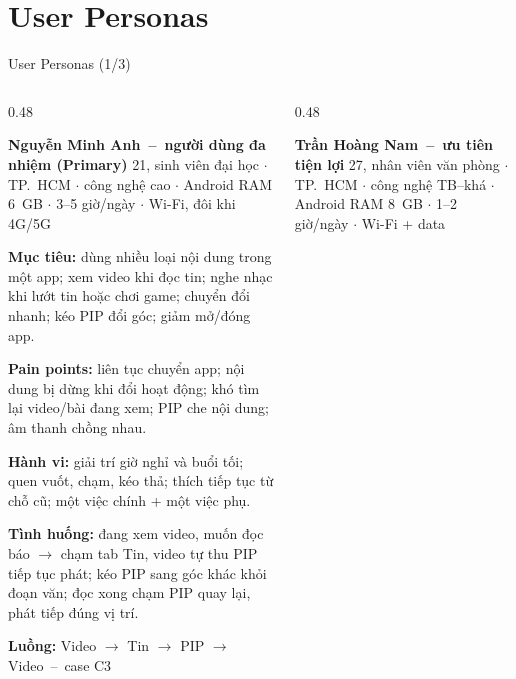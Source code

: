 \documentclass[aspectratio=169]{beamer}
\begin{document}
\section{User Personas}
\begin{frame}{User Personas (1/3)}
  \begin{columns}
    \begin{column}{0.48\textwidth}
      \begin{block}{\scriptsize\bfseries Nguyễn Minh Anh~--~người dùng đa nhiệm {\tiny(Primary)}}
        {\tiny\color{brandgray} 21, sinh viên đại học $\cdot$ TP.\ HCM $\cdot$ công nghệ cao $\cdot$ Android RAM 6~GB $\cdot$ 3--5 giờ/ngày $\cdot$ Wi-Fi, đôi khi 4G/5G}\par\vspace{0.6mm}
        {\tiny\textbf{Mục tiêu:} dùng nhiều loại nội dung trong một app; xem video khi đọc tin; nghe nhạc khi lướt tin hoặc chơi game; chuyển đổi nhanh; kéo PIP đổi góc; giảm mở/đóng app.}\par\vspace{0.3mm}
        {\tiny\textbf{Pain points:} liên tục chuyển app; nội dung bị dừng khi đổi hoạt động; khó tìm lại video/bài đang xem; PIP che nội dung; âm thanh chồng nhau.}\par\vspace{0.3mm}
        {\tiny\textbf{Hành vi:} giải trí giờ nghỉ và buổi tối; quen vuốt, chạm, kéo thả; thích tiếp tục từ chỗ cũ; một việc chính + một việc phụ.}\par\vspace{0.3mm}
        {\tiny\textbf{Tình huống:} đang xem video, muốn đọc báo $\rightarrow$ chạm tab Tin, video tự thu PIP tiếp tục phát; kéo PIP sang góc khác khỏi đoạn văn; đọc xong chạm PIP quay lại, phát tiếp đúng vị trí.}\par\vspace{0.3mm}
        {\tiny\textbf{Luồng:} \textcolor{brandteal!60!black}{Video $\rightarrow$ Tin $\rightarrow$ PIP $\rightarrow$ Video}~--~case C3}
      \end{block}
    \end{column}
    \begin{column}{0.48\textwidth}
      \begin{block}{\scriptsize\bfseries Trần Hoàng Nam~--~ưu tiên tiện lợi}
        {\tiny\color{brandgray} 27, nhân viên văn phòng $\cdot$ TP.\ HCM $\cdot$ công nghệ TB--khá $\cdot$ Android RAM 8~GB $\cdot$ 1--2 giờ/ngày $\cdot$ Wi-Fi + data}\par\vspace{0.6mm}

\end{block}
\end{column}
\end{columns}
\end{frame}
\end{document}
